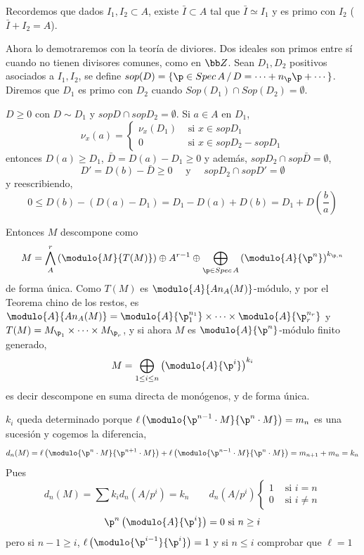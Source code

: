     \begin{prop}
        Recordemos que dados $I_1, I_2\subset A$, existe $\bar I\subset A$ tal que $\bar I \simeq I_1$ y es primo con $I_2$ ($\bar I + I_2 = A$). 
    \end{prop}
    \begin{dem}
        Ahora lo demotraremos con la teor\'ia de diviores. Dos ideales son primos entre s\'i cuando no tienen divisores comunes, como en $\bb Z$. Sean $D_1, D_2 $ positivos asociados a $I_1,I_2$, se define $sop(D) = \{\p \in Spec\, A \, / \, D = \cdots + n_\p \p + \cdots \}$. Diremos que $D_1$ es primo con $D_2$ cuando $Sop(D_1)\cap Sop(D_2) = \emptyset$. 

        $D\ge 0$ con $D\sim D_1$ y $sop D \cap sop D_2 = \emptyset$. Si $a\in A$ en $D_1$, 
        $$\nu_x(a) = \begin{cases}
            \nu_x(D_1) & \text{ si } x\in sop D_1 \\ 0 & \text{ si } x \in sop D_2 - sop D_1  
        \end{cases}$$
        entonces $D(a) \ge D_1$, $\bar D = D(a)-D_1 \ge 0$ y adem\'as, $sop D_2 \cap sop \bar D = \emptyset$, 
        $$D' = D(b) - \bar D \ge 0 \quad \text{ y } \quad sop D_2 \cap sop D' = \emptyset $$
        y reescribiendo, 
        $$0 \le D(b) - (D(a)-D_1) = D_1 - D(a) + D(b) = D_1 + D\left(\frac{b}{a}\right) $$
    \end{dem}
    \begin{cor}
        Entonces $M$ descompone como
        $$M = \bigwedge_A^r \left( \modulo{M}{T(M)} \right) \oplus A^{r-1} \oplus \bigoplus_{\p \in Spec\, A} \left( \modulo{A}{\p^n} \right)^{k_{\p,n}}$$
        de forma única. Como $T(M)$ es $\modulo{A}{An_A(M)}$-m\'odulo, y por el Teorema chino de los restos, es $\modulo{A}{An_A(M)} = \modulo{A}{\p_1^{n_1}} \times \cdots \times \modulo{A}{\p_r^{n_r}}$ y $T(M) = M_{\p_1}\times \cdots \times  M_{\p_r}$, y si ahora $M$ es $\modulo{A}{\p^n}$-m\'odulo finito generado, 
        $$M = \bigoplus_{1 \le i \le n} \left( \modulo{A}{\p^i} \right)^{k_i}$$
        es decir descompone en suma directa de mon\'ogenos, y de forma \'unica. 
    \end{cor}
    \begin{dem}
        [Unicidad] $k_i$ queda determinado porque $\ell \left( \modulo{\p^{n-1} \cdot M }{\p^n \cdot M}\right) = m_n$ es una sucesi\'on y cogemos la diferencia, 
        $$ d_n(M) = \ell \left( \modulo{\p^{n} \cdot M }{\p^{n+1} \cdot M}\right) + \ell \left( \modulo{\p^{n-1} \cdot M }{\p^n \cdot M}\right) = m_{n+1} + m_n = k_n$$
        Pues 
        $$d_n(M) = \sum k_i d_n(A/p^i) = k_n \qquad d_n(A/p^i)\begin{cases}
            1 & \text{ si } i=n \\ 0 & \text{ si } i\neq n 
        \end{cases}$$ 
        $$\p^n \left( \modulo{A}{\p^i} \right) = 0 \text{ si } n \ge i $$
        pero si $n-1\ge i$, $\ell\left( \modulo{\p^{i-1}}{\p^i} \right)=1$ y si $n \le i$ comprobar que $\ell=1$
    \end{dem}